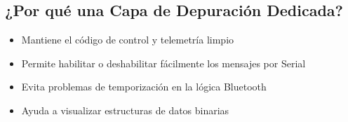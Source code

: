 \documentclass[12pt,a4paper]{article}
\begin{document}
\subsection{¿Por qué una Capa de Depuración Dedicada?}

\begin{itemize}
	\item Mantiene el código de control y telemetría limpio
	\item Permite habilitar o deshabilitar fácilmente los mensajes por Serial
	\item Evita problemas de temporización en la lógica Bluetooth
	\item Ayuda a visualizar estructuras de datos binarias
\end{itemize}
\end{document}
